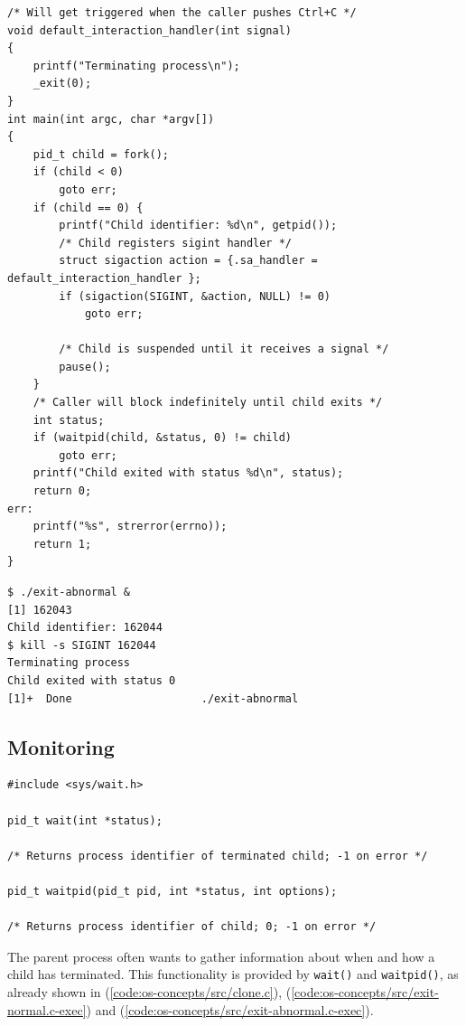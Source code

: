 \begin{lstlisting}[label={code:os-concepts/src/exit-abnormal.c}, style=c-code-snippets, caption={os-concepts/src/exit-abnormal.c}]
/* Will get triggered when the caller pushes Ctrl+C */
void default_interaction_handler(int signal)
{
    printf("Terminating process\n");
    _exit(0);
}
int main(int argc, char *argv[])
{
    pid_t child = fork();
    if (child < 0)
        goto err;
    if (child == 0) {
        printf("Child identifier: %d\n", getpid());
        /* Child registers sigint handler */
        struct sigaction action = {.sa_handler = default_interaction_handler };
        if (sigaction(SIGINT, &action, NULL) != 0)
            goto err;

        /* Child is suspended until it receives a signal */
        pause();
    }
    /* Caller will block indefinitely until child exits */
    int status;
    if (waitpid(child, &status, 0) != child)
        goto err;
    printf("Child exited with status %d\n", status);
    return 0;
err:
    printf("%s", strerror(errno));
    return 1;
}
\end{lstlisting}
\begin{lstlisting}[label={code:os-concepts/src/exit-abnormal.c-exec}, style=bash, caption={os-concepts/src/exit-abnormal.c output}]
$ ./exit-abnormal &
[1] 162043
Child identifier: 162044
$ kill -s SIGINT 162044
Terminating process
Child exited with status 0
[1]+  Done                    ./exit-abnormal
\end{lstlisting}
\subsection{Monitoring}
\label{ch:fundamentals/processes/monitoring}
\begin{lstlisting}[style=syscalls, caption={Wait System Call and Wrappers}]
#include <sys/wait.h>

pid_t wait(int *status);

/* Returns process identifier of terminated child; -1 on error */

pid_t waitpid(pid_t pid, int *status, int options);

/* Returns process identifier of child; 0; -1 on error */
\end{lstlisting}
The parent process often wants to gather information about when and how a child has terminated. 
This functionality is provided by \verb|wait()| and \verb|waitpid()|, as already shown in 
(\ref{code:os-concepts/src/clone.c}), (\ref{code:os-concepts/src/exit-normal.c-exec}) and (\ref{code:os-concepts/src/exit-abnormal.c-exec}).



